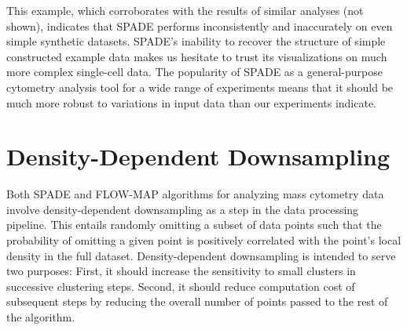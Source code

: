 \documentclass{article}
\begin{document}





This example, which corroborates with the results of similar analyses (not shown), indicates that SPADE performs inconsistently and inaccurately on even simple synthetic datasets. 
 SPADE's inability to recover the structure of simple constructed example data makes us hesitate to trust its visualizations on much more complex single-cell data. 
The popularity of SPADE as a general-purpose cytometry analysis tool for a wide range of experiments means that it should be much more robust to variations in input data than our experiments indicate. 



\section{Density-Dependent Downsampling}
\label{sec:downsampling}
Both SPADE and FLOW-MAP algorithms for analyzing mass cytometry data involve density-dependent downsampling as a step in the data processing pipeline. 
This entails randomly omitting a subset of data points such that the probability of omitting a given point is positively correlated with the point’s local density in the full dataset. 
 Density-dependent downsampling is intended to serve two purposes:  First, it should increase the sensitivity to small clusters in successive clustering steps.
 Second, it should reduce computation cost of subsequent steps by reducing the overall number of points passed to the rest of the algorithm.
\end{document}

